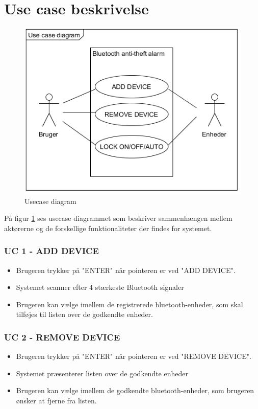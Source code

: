 \section{Use case beskrivelse}

\begin{figure}[H]
	\centering
	\includegraphics[width = 300 pt]{Img/Usecase_Diagram.png}
	\caption{Usecase diagram}
	\label{fig:Usecase diagram}
\end{figure}

På figur \ref{fig:Usecase diagram} ses usecase diagrammet som beskriver sammenhængen mellem aktørerne og de forskellige funktionaliteter der findes for systemet.

\subsubsection{UC 1 - ADD DEVICE}
\begin{itemize}
\item Brugeren trykker på "ENTER" når pointeren er ved "ADD DEVICE".
\item Systemet scanner efter 4 stærkeste Bluetooth signaler
\item Brugeren kan vælge imellem de registrerede bluetooth-enheder, som skal tilføjes til listen over de godkendte enheder.
\end{itemize}


\subsubsection{UC 2 - REMOVE DEVICE}

\begin{itemize}
	\item Brugeren trykker på "ENTER" når pointeren er ved "REMOVE DEVICE".
	\item Systemet præsenterer listen over de godkendte enheder
	\item Brugeren kan vælge imellem de godkendte bluetooth-enheder, som brugeren ønsker at fjerne fra listen.
\end{itemize} 

